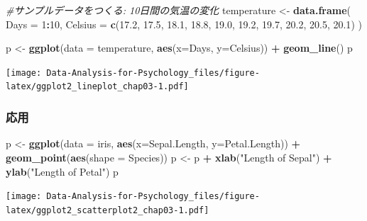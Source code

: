 \documentclass[]{article}
\newenvironment{Shaded}{\begin{snugshade}}{\end{snugshade}}
\newcommand{\KeywordTok}[1]{\textcolor[rgb]{0.13,0.29,0.53}{\textbf{#1}}}
\newcommand{\DataTypeTok}[1]{\textcolor[rgb]{0.13,0.29,0.53}{#1}}
\newcommand{\DecValTok}[1]{\textcolor[rgb]{0.00,0.00,0.81}{#1}}
\newcommand{\FloatTok}[1]{\textcolor[rgb]{0.00,0.00,0.81}{#1}}
\newcommand{\StringTok}[1]{\textcolor[rgb]{0.31,0.60,0.02}{#1}}
\newcommand{\CommentTok}[1]{\textcolor[rgb]{0.56,0.35,0.01}{\textit{#1}}}
\newcommand{\OperatorTok}[1]{\textcolor[rgb]{0.81,0.36,0.00}{\textbf{#1}}}
\newcommand{\NormalTok}[1]{#1}
\begin{document}
\begin{Shaded}
\begin{Highlighting}[]
\CommentTok{#サンプルデータをつくる: 10日間の気温の変化}
\NormalTok{temperature <-}\StringTok{ }\KeywordTok{data.frame}\NormalTok{(}
    \DataTypeTok{Days  =} \DecValTok{1}\OperatorTok{:}\DecValTok{10}\NormalTok{, }
    \DataTypeTok{Celsius =} \KeywordTok{c}\NormalTok{(}\FloatTok{17.2}\NormalTok{, }\FloatTok{17.5}\NormalTok{, }\FloatTok{18.1}\NormalTok{, }\FloatTok{18.8}\NormalTok{, }\FloatTok{19.0}\NormalTok{, }\FloatTok{19.2}\NormalTok{, }\FloatTok{19.7}\NormalTok{, }\FloatTok{20.2}\NormalTok{, }\FloatTok{20.5}\NormalTok{, }\FloatTok{20.1}\NormalTok{)}
\NormalTok{)}

\NormalTok{p <-}\StringTok{ }\KeywordTok{ggplot}\NormalTok{(}\DataTypeTok{data =}\NormalTok{ temperature, }\KeywordTok{aes}\NormalTok{(}\DataTypeTok{x=}\NormalTok{Days, }\DataTypeTok{y=}\NormalTok{Celsius)) }\OperatorTok{+}\StringTok{ }
\StringTok{      }\KeywordTok{geom_line}\NormalTok{()}
\NormalTok{p}
\end{Highlighting}
\end{Shaded}

\texttt{[image: Data-Analysis-for-Psychology\_files/figure-latex/ggplot2\_lineplot\_chap03-1.pdf]}

\subsubsection{応用}

\begin{Shaded}
\begin{Highlighting}[]
\NormalTok{p <-}\StringTok{ }\KeywordTok{ggplot}\NormalTok{(}\DataTypeTok{data =}\NormalTok{ iris, }\KeywordTok{aes}\NormalTok{(}\DataTypeTok{x=}\NormalTok{Sepal.Length, }\DataTypeTok{y=}\NormalTok{Petal.Length)) }\OperatorTok{+}\StringTok{ }
\StringTok{      }\KeywordTok{geom_point}\NormalTok{(}\KeywordTok{aes}\NormalTok{(}\DataTypeTok{shape =}\NormalTok{ Species))}
\NormalTok{p <-}\StringTok{ }\NormalTok{p }\OperatorTok{+}\StringTok{ }\KeywordTok{xlab}\NormalTok{(}\StringTok{"Length of Sepal"}\NormalTok{) }\OperatorTok{+}\StringTok{ }\KeywordTok{ylab}\NormalTok{(}\StringTok{"Length of Petal"}\NormalTok{) }
\NormalTok{p}
\end{Highlighting}
\end{Shaded}

\texttt{[image: Data-Analysis-for-Psychology\_files/figure-latex/ggplot2\_scatterplot2\_chap03-1.pdf]}
\end{document}
